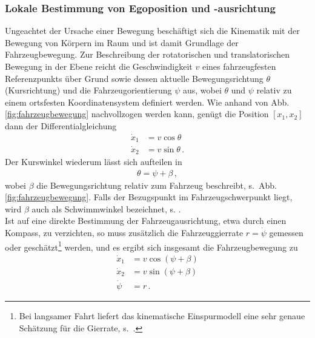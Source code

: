 \subsubsection{Lokale Bestimmung von Egoposition und -ausrichtung} \label{sec:koppelnavi}
Ungeachtet der Ursache einer Bewegung beschäftigt sich die Kinematik mit der Bewegung von Körpern im Raum und ist damit Grundlage der Fahrzeugbewegung. Zur Beschreibung der rotatorischen und translatorischen Bewegung in der Ebene reicht die Geschwindigkeit $v$ eines fahrzeugfesten Referenzpunkts über Grund sowie dessen aktuelle Bewegungsrichtung $\theta$ (Kursrichtung) und die Fahrzeugorientierung $\psi$ aus, wobei  $\theta$ und $\psi$ relativ zu einem ortsfesten Koordinatensystem definiert werden. Wie anhand von Abb.\,\ref{fig:fahrzeugbewegung} nachvollzogen werden kann, genügt die Position $[x_1, x_2]$ dann der Differentialgleichung
\begin{align*}
	\dot x_1 &= v \cos\theta \\
	\dot x_2 &= v \sin\theta\,.
\end{align*}
Der Kurswinkel wiederum lässt sich aufteilen in
\begin{align*}
	\theta = \psi + \beta\, ,
\end{align*}
wobei $\beta$ die Bewegungsrichtung relativ zum Fahrzeug beschreibt, s.\ Abb.\,\ref{fig:fahrzeugbewegung}. Falls der Bezugspunkt im Fahrzeugschwerpunkt liegt, wird $\beta$ auch als Schwimmwinkel bezeichnet, s. . \\
%
Ist auf eine direkte Bestimmung der Fahrzeugausrichtung, etwa durch einen Kompass, zu verzichten, so muss zusätzlich die Fahrzeuggierrate $r=\dot \psi$ gemessen oder geschätzt\footnote{Bei langsamer Fahrt liefert das kinematische Einspurmodell eine sehr genaue Schätzung für die Gierrate, s.\ .} werden, und es ergibt sich insgesamt die Fahrzeugbewegung zu
\begin{align*}
	\dot x_1 &= v \cos(\psi + \beta) \\
	\dot x_2 &= v \sin(\psi + \beta) \\
  \dot   \psi &= r \,.
\end{align*}
